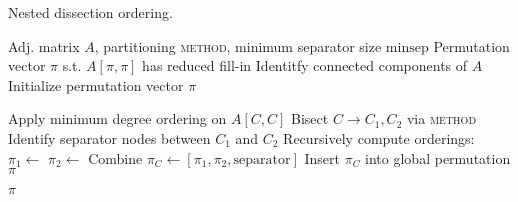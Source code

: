 \begin{algorithm}
    \caption{Nested dissection ordering.}
    \label{alg:nested_dis}
    \begin{algorithmic}[1]
        \Require Adj. matrix \( A \), partitioning \textsc{method}, minimum separator size $\mathrm{minsep}$
        \Ensure Permutation vector \(\pi\) s.t. \(A[\pi, \pi]\) has reduced fill-in
            \State Identitfy connected components of \(A\)
            \State Initialize permutation vector \(\pi\)

                    \State Apply minimum degree ordering on \(A[C, C]\)
                \Else
                    \State Bisect \(C \rightarrow C_1, C_2\) via \textsc{method} 
                    \State Identify separator nodes between \(C_1\) and \(C_2\)
                    \State Recursively compute orderings:
                    \State \hspace{2em}$\pi_1 \gets$ 
                    \State \hspace{2em}$\pi_2 \gets$ 
                    \State Combine \(\pi_C \gets [\pi_1, \pi_2, \text{separator}]\)
                \EndIf
                \State Insert \(\pi_C\) into global permutation \(\pi\)
            \EndFor
            
            \State \Return \(\pi\)
        \EndFunction
    \end{algorithmic}
\end{algorithm}